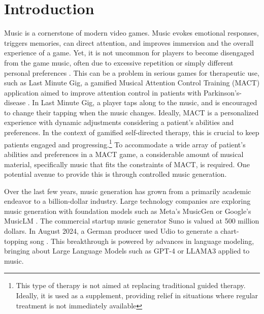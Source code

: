 

\chapter{Introduction}
\label{chap:intro}
\pagestyle{fancy}

Music is a cornerstone of modern video games. Music evokes emotional responses, triggers memories, can direct attention, and improves immersion and the overall experience of a game. Yet, it is not uncommon for players to become disengaged from the game music, often due to excessive repetition or simply different personal preferences \cite{Rogers_Weber_2019}. This can be a problem in serious games for therapeutic use, such as Last Minute Gig, a gamified Musical Attention Control Training (MACT) application aimed to improve attention control in patients with Parkinson's-disease \cite{Chalkiadakis_2022}. In Last Minute Gig, a player taps along to the music, and is encouraged to change their tapping when the music changes. Ideally, MACT is a personalized experience with dynamic adjustments considering a patient's abilities and preferences. In the context of gamified self-directed therapy, this is crucial to keep patients engaged and progressing.\footnote{This type of therapy is not aimed at replacing traditional guided therapy. Ideally, it is used as a supplement,  providing relief in situations where regular treatment is not immediately available} To accommodate a wide array of patient's abilities and preferences in a MACT game, a considerable amount of musical material, specifically music that fits the constraints of MACT, is required. One potential avenue to provide this is through controlled music generation.

Over the last few years, music generation has grown from a primarily academic endeavor to a billion-dollar industry. Large technology companies are exploring music generation with foundation models such as Meta’s MusicGen \cite{copet2023simple} or Google’s MusicLM 
\cite{Agostinelli_Denk_Borsos_Engel_Verzetti_Caillon_Huang_Jansen_Roberts_Tagliasacchi_et_al._2023}. The commercial startup music generator Suno is valued at 500 million dollars. In August 2024, a German producer used Udio to generate a chart-topping song \cite{Ferdinand_Meyen_2024}\cite{Stassen_2024}. This breakthrough is powered by advances in language modeling, bringing about Large Language Models such as GPT-4 or LLAMA3 applied to music.

